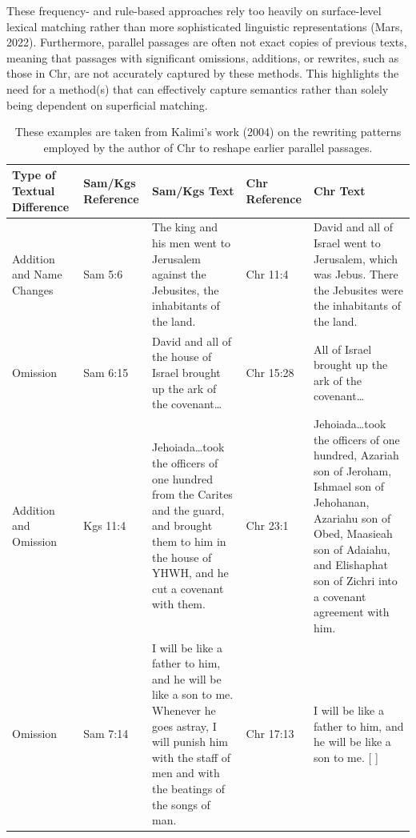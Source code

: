 \documentclass[12pt]{article}
\begin{document}
These frequency- and rule-based approaches rely too heavily on surface-level lexical matching rather than more sophisticated linguistic representations (Mars, 2022). Furthermore, parallel passages are often not exact copies of previous texts, meaning that passages with significant omissions, additions, or rewrites, such as those in Chr, are not accurately captured by these methods. This highlights the need for a method(s) that can effectively capture semantics rather than solely being dependent on superficial matching.

\begin{table}[htbp]
\centering
\label{tab:kalimi}
\begin{tabularx}{\textwidth}{
  @{}>{\raggedright\arraybackslash}p{2cm}
     >{\raggedright\arraybackslash}p{1.8cm}
     >{\raggedright\arraybackslash}X
     >{\raggedright\arraybackslash}p{1.8cm}
     >{\raggedright\arraybackslash}X@{}
}
\toprule
\textbf{Type of Textual Difference} 
 & \textbf{Sam/Kgs Reference} 
 & \textbf{Sam/Kgs Text} 
 & \textbf{Chr Reference} 
 & \textbf{Chr Text} \\
\midrule
Addition and Name Changes 
 & 2 Sam 5:6 
 & The king and his men went to Jerusalem against the Jebusites, the inhabitants of the land.
 & 1 Chr 11:4
 & David and all of Israel went to Jerusalem, which was Jebus. There the Jebusites were the inhabitants of the land. \\[1ex]

Omission 
 & 2 Sam 6:15 
 & David and all of the house of Israel brought up the ark of the covenant\ldots 
 & 1 Chr 15:28 
 & [ ] All of Israel brought up the ark of the covenant\ldots \\[1ex]

Addition and Omission 
 & 2 Kgs 11:4 
 & Jehoiada\ldots took the officers of one hundred from the Carites and the guard, and brought them to him in the house of YHWH, and he cut a covenant with them.
 & 2 Chr 23:1
 & Jehoiada\ldots took the officers of one hundred, Azariah son of Jeroham, Ishmael son of Jehohanan, Azariahu son of Obed, Maasieah son of Adaiahu, and Elishaphat son of Zichri into a covenant agreement with him. \\[1ex]

Omission 
 & 2 Sam 7:14 
 & I will be like a father to him, and he will be like a son to me. Whenever he goes astray, I will punish him with the staff of men and with the beatings of the songs of man.
 & 1 Chr 17:13
 & I will be like a father to him, and he will be like a son to me. [ ] \\
\bottomrule
\end{tabularx}
\caption{These examples are taken from Kalimi’s work (2004) on the rewriting patterns employed by the author of Chr to reshape earlier parallel passages.}
\end{table}
\end{document}
